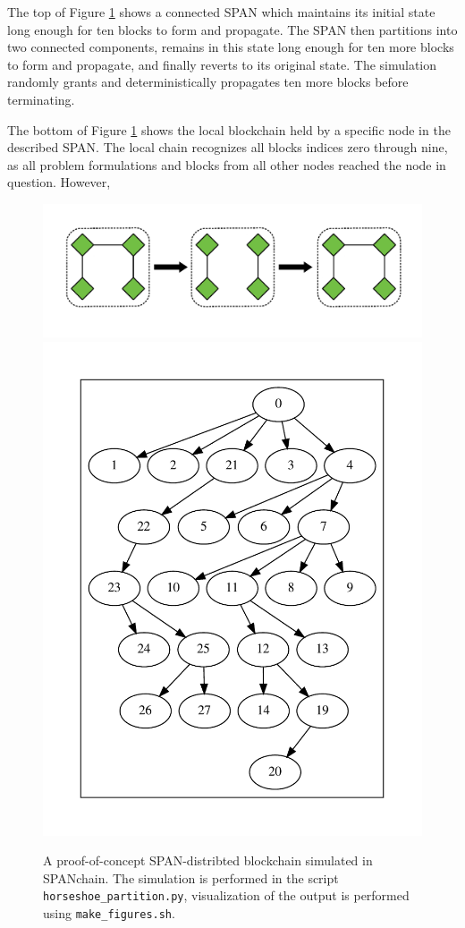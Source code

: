 The top of Figure \ref{fig:old_town_road} shows a connected SPAN which maintains
its initial state long enough for ten blocks to form and propagate. The SPAN
then partitions into two connected components, remains in this state long enough for
ten more blocks to form and propagate, and finally reverts to its original state.
The simulation randomly grants and deterministically propagates ten more blocks before
terminating.

The bottom of Figure \ref{fig:old_town_road} shows the local blockchain held by a
specific node in the described SPAN. The local chain recognizes all blocks indices
zero through nine, as all problem formulations and blocks from all other nodes
reached the node in question. However, 

\begin{figure}
	\centering
	\includegraphics[width=\columnwidth]{horseshoe.pdf}
	\includegraphics[width=\columnwidth]{horseshoe_0.pdf}
	\caption{A proof-of-concept SPAN-distribted blockchain simulated in SPANchain.
		The simulation is performed in the script \texttt{horseshoe\_partition.py},
		visualization of the output is performed using \texttt{make\_figures.sh}.}
	\label{fig:old_town_road}
\end{figure}
